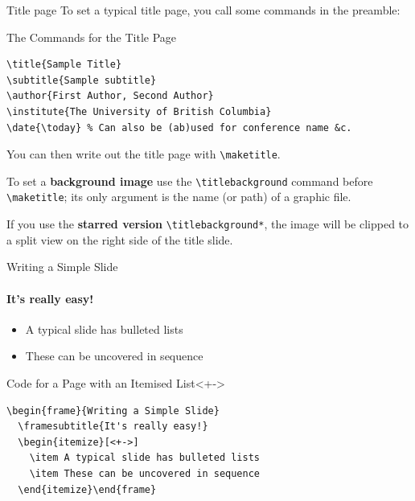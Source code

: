 \begin{frame}[fragile]{Title page}
To set a typical title page, you call some commands in the preamble:
\begin{block}{The Commands for the Title Page}
\begin{verbatim}
\title{Sample Title}
\subtitle{Sample subtitle}
\author{First Author, Second Author}
\institute{The University of British Columbia}
\date{\today} % Can also be (ab)used for conference name &c.
\end{verbatim}
\end{block}
You can then write out the title page with \verb|\maketitle|.

To set a \textbf{background image} use the \verb|\titlebackground| command 
before \verb|\maketitle|; its only argument is the name (or path) of a graphic 
file.

If you use the \textbf{starred version} \verb|\titlebackground*|, the image 
will be clipped to a split view on the right side of the title slide.

\end{frame}

\begin{frame}[fragile]{Writing a Simple Slide}
\framesubtitle{It's really easy!}
\begin{itemize}[<+->]
\item A typical slide has bulleted lists
\item These can be uncovered in sequence
\end{itemize}
\begin{block}{Code for a Page with an Itemised List}<+->
\begin{verbatim}
\begin{frame}{Writing a Simple Slide}
  \framesubtitle{It's really easy!}
  \begin{itemize}[<+->]
    \item A typical slide has bulleted lists
    \item These can be uncovered in sequence
  \end{itemize}\end{frame}
\end{verbatim}
\end{block}
\end{frame}


